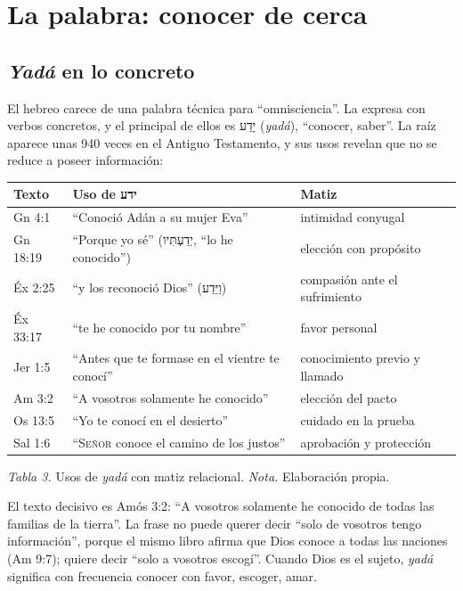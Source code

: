 \documentclass[11pt,letterpaper]{article}
\newcommand{\heb}[1]{\mbox{\foreignlanguage{hebrew}{#1}}}
\newcommand{\SENOR}{\textsc{Señor}}
\begin{document}
\section{La palabra: conocer de cerca}

\subsection{\emph{Yadá} en lo concreto}
El hebreo carece de una palabra técnica para ``omnisciencia''. La expresa con verbos concretos, y el principal de ellos es \heb{יָדַע} (\emph{yadá}), ``conocer, saber''. La raíz aparece unas 940 veces en el Antiguo Testamento, y sus usos revelan que no se reduce a poseer información:

\begin{center}\small\renewcommand{\arraystretch}{1.2}
\begin{tabular}{@{}L{2.0cm}L{6.4cm}L{6.0cm}@{}}
\toprule
\textbf{Texto} & \textbf{Uso de \heb{ידע}} & \textbf{Matiz} \\ \midrule
Gn 4:1 & ``Conoció Adán a su mujer Eva'' & intimidad conyugal \\
Gn 18:19 & ``Porque yo sé'' (\heb{יְדַעְתִּיו}, ``lo he conocido'') & elección con propósito \\
Éx 2:25 & ``y los reconoció Dios'' (\heb{וַיֵּדַע}) & compasión ante el sufrimiento \\
Éx 33:17 & ``te he conocido por tu nombre'' & favor personal \\
Jer 1:5 & ``Antes que te formase en el vientre te conocí'' & conocimiento previo y llamado \\
Am 3:2 & ``A vosotros solamente he conocido'' & elección del pacto \\
Os 13:5 & ``Yo te conocí en el desierto'' & cuidado en la prueba \\
Sal 1:6 & ``\SENOR{} conoce el camino de los justos'' & aprobación y protección \\
\bottomrule
\end{tabular}\par
{\footnotesize\color{gris}\textit{Tabla 3.} Usos de \emph{yadá} con matiz relacional. \textit{Nota.} Elaboración propia.}
\end{center}

El texto decisivo es Amós 3:2: ``A vosotros solamente he conocido de todas las familias de la tierra''. La frase no puede querer decir ``solo de vosotros tengo información'', porque el mismo libro afirma que Dios conoce a todas las naciones (Am 9:7); quiere decir ``solo a vosotros escogí''. Cuando Dios es el sujeto, \emph{yadá} significa con frecuencia conocer con favor, escoger, amar.
\end{document}
